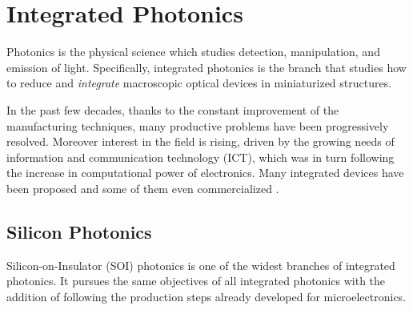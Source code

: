 \chapter{Integrated Photonics}
\label{ch:Integrated_Photonics}


Photonics is the physical science which studies detection, manipulation, and emission of light.
Specifically, integrated photonics is the branch that studies how to reduce and \textit{integrate} macroscopic optical devices in miniaturized structures.

In the past few decades, thanks to the constant improvement of the manufacturing techniques, many productive problems have been progressively resolved.
Moreover interest in the field is rising, driven by the growing needs of information and communication technology (ICT), which was in turn following the increase in computational power of electronics.
Many integrated devices have been proposed and some of them even commercialized \cite{thunderbolt}.


\section{Silicon Photonics}
\label{sec:Silicon_Photonics}
Silicon-on-Insulator (SOI) photonics is one of the widest branches of integrated photonics.
It pursues the same objectives of all integrated photonics with the addition of following the production steps already developed for microelectronics.

